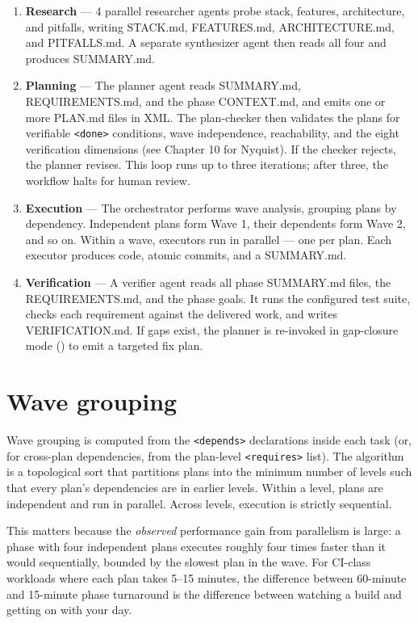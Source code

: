 \documentclass[11pt,letterpaper,openany]{book}
\begin{document}
\begin{enumerate}[leftmargin=1.2em]
  \item \textbf{Research} — 4 parallel researcher agents probe stack, features, architecture, and pitfalls, writing STACK.md, FEATURES.md, ARCHITECTURE.md, and PITFALLS.md. A separate synthesizer agent then reads all four and produces SUMMARY.md.
  \item \textbf{Planning} — The planner agent reads SUMMARY.md, REQUIREMENTS.md, and the phase CONTEXT.md, and emits one or more PLAN.md files in XML. The plan-checker then validates the plans for verifiable \texttt{<done>} conditions, wave independence, reachability, and the eight verification dimensions (see Chapter 10 for Nyquist). If the checker rejects, the planner revises. This loop runs up to three iterations; after three, the workflow halts for human review.
  \item \textbf{Execution} — The orchestrator performs wave analysis, grouping plans by dependency. Independent plans form Wave 1, their dependents form Wave 2, and so on. Within a wave, executors run in parallel — one per plan. Each executor produces code, atomic commits, and a SUMMARY.md.
  \item \textbf{Verification} — A verifier agent reads all phase SUMMARY.md files, the REQUIREMENTS.md, and the phase goals. It runs the configured test suite, checks each requirement against the delivered work, and writes VERIFICATION.md. If gaps exist, the planner is re-invoked in gap-closure mode () to emit a targeted fix plan.
\end{enumerate}

\section{Wave grouping}

Wave grouping is computed from the \texttt{<depends>} declarations inside each task (or, for cross-plan dependencies, from the plan-level \texttt{<requires>} list). The algorithm is a topological sort that partitions plans into the minimum number of levels such that every plan's dependencies are in earlier levels. Within a level, plans are independent and run in parallel. Across levels, execution is strictly sequential.

This matters because the \emph{observed} performance gain from parallelism is large: a phase with four independent plans executes roughly four times faster than it would sequentially, bounded by the slowest plan in the wave. For CI-class workloads where each plan takes 5--15 minutes, the difference between 60-minute and 15-minute phase turnaround is the difference between watching a build and getting on with your day.
\end{document}
